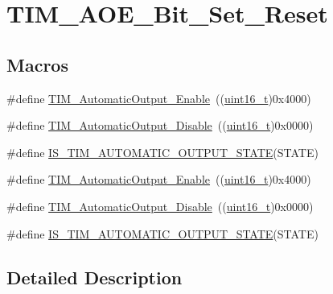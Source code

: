 \hypertarget{group___t_i_m___a_o_e___bit___set___reset}{}\section{T\+I\+M\+\_\+\+A\+O\+E\+\_\+\+Bit\+\_\+\+Set\+\_\+\+Reset}
\label{group___t_i_m___a_o_e___bit___set___reset}
\subsection*{Macros}
\begin{DoxyCompactItemize}
\item 
\#define \hyperlink{group___t_i_m___a_o_e___bit___set___reset_gaa416873d01fe62fe8d3f9c8bb7853fa1}{T\+I\+M\+\_\+\+Automatic\+Output\+\_\+\+Enable}~((\hyperlink{_p_e___types_8h_a1f1825b69244eb3ad2c7165ddc99c956}{uint16\+\_\+t})0x4000)
\item 
\#define \hyperlink{group___t_i_m___a_o_e___bit___set___reset_ga0f80ba4fbadd434bc82ca63e904ace41}{T\+I\+M\+\_\+\+Automatic\+Output\+\_\+\+Disable}~((\hyperlink{_p_e___types_8h_a1f1825b69244eb3ad2c7165ddc99c956}{uint16\+\_\+t})0x0000)
\item 
\#define \hyperlink{group___t_i_m___a_o_e___bit___set___reset_gaabce6b8865d80929bf69c6c3c7780846}{I\+S\+\_\+\+T\+I\+M\+\_\+\+A\+U\+T\+O\+M\+A\+T\+I\+C\+\_\+\+O\+U\+T\+P\+U\+T\+\_\+\+S\+T\+A\+TE}(S\+T\+A\+TE)
\item 
\#define \hyperlink{group___t_i_m___a_o_e___bit___set___reset_gaa416873d01fe62fe8d3f9c8bb7853fa1}{T\+I\+M\+\_\+\+Automatic\+Output\+\_\+\+Enable}~((\hyperlink{_p_e___types_8h_a1f1825b69244eb3ad2c7165ddc99c956}{uint16\+\_\+t})0x4000)
\item 
\#define \hyperlink{group___t_i_m___a_o_e___bit___set___reset_ga0f80ba4fbadd434bc82ca63e904ace41}{T\+I\+M\+\_\+\+Automatic\+Output\+\_\+\+Disable}~((\hyperlink{_p_e___types_8h_a1f1825b69244eb3ad2c7165ddc99c956}{uint16\+\_\+t})0x0000)
\item 
\#define \hyperlink{group___t_i_m___a_o_e___bit___set___reset_gaabce6b8865d80929bf69c6c3c7780846}{I\+S\+\_\+\+T\+I\+M\+\_\+\+A\+U\+T\+O\+M\+A\+T\+I\+C\+\_\+\+O\+U\+T\+P\+U\+T\+\_\+\+S\+T\+A\+TE}(S\+T\+A\+TE)
\end{DoxyCompactItemize}


\subsection{Detailed Description}


